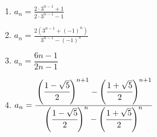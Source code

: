 \noindent{}\par\nobreak
\begin{enumerate}[label=(\arabic*),parsep=3pt,format=\bookitemlink{example-mobius-1}{answer}{problem}]
  \item $\displaystyle a_n=\frac{2\cdot3^{n-1}+1}{2\cdot3^{n-1}-1}$
  \item $\displaystyle a_n=\frac{2\left(3^{n-1}+(-1)^n\right)}{3^{n-1}-(-1)^n}$
  \item $a_{n}=\dfrac{6n-1}{2n-1}$
  \item $\displaystyle a_n=\cfrac{\left(\cfrac{1-\sqrt{5}}{2}\right)^{n+1}-\left(\cfrac{1+\sqrt{5}}{2}\right)^{n+1}}{\left(\cfrac{1-\sqrt{5}}{2}\right)^n-\left(\cfrac{1+\sqrt{5}}{2}\right)^n}$
\end{enumerate}

